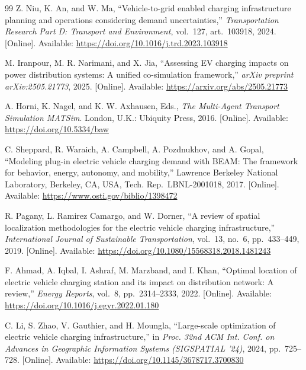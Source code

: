 \begin{thebibliography}{99}
    Z. Niu, K. An, and W. Ma,
    ``Vehicle-to-grid enabled charging infrastructure planning and operations considering demand uncertainties,''
    \textit{Transportation Research Part D: Transport and Environment}, vol.~127, art.~103918, 2024. [Online]. Available:
    \url{https://doi.org/10.1016/j.trd.2023.103918}

    M. Iranpour, M. R. Narimani, and X. Jia,
    ``Assessing EV charging impacts on power distribution systems: A unified co-simulation framework,''
    \textit{arXiv preprint arXiv:2505.21773}, 2025. [Online]. Available:
    \url{https://arxiv.org/abs/2505.21773}

    A. Horni, K. Nagel, and K. W. Axhausen, Eds.,
    \textit{The Multi-Agent Transport Simulation MATSim}.
    London, U.K.: Ubiquity Press, 2016. [Online]. Available:
    \url{https://doi.org/10.5334/baw}

    C. Sheppard, R. Waraich, A. Campbell, A. Pozdnukhov, and A. Gopal,
    ``Modeling plug-in electric vehicle charging demand with BEAM: The framework for behavior, energy, autonomy, and mobility,''
    Lawrence Berkeley National Laboratory, Berkeley, CA, USA,
    Tech. Rep.~LBNL-2001018, 2017. [Online]. Available:
    \url{https://www.osti.gov/biblio/1398472}

    R. Pagany, L. Ramirez Camargo, and W. Dorner,
    ``A review of spatial localization methodologies for the electric vehicle charging infrastructure,''
    \textit{International Journal of Sustainable Transportation}, vol.~13, no.~6, pp.~433--449, 2019. [Online]. Available:
    \url{https://doi.org/10.1080/15568318.2018.1481243}

    F. Ahmad, A. Iqbal, I. Ashraf, M. Marzband, and I. Khan,
    ``Optimal location of electric vehicle charging station and its impact on distribution network: A review,''
    \textit{Energy Reports}, vol.~8, pp.~2314--2333, 2022. [Online]. Available:
    \url{https://doi.org/10.1016/j.egyr.2022.01.180}

    C. Li, S. Zhao, V. Gauthier, and H. Moungla,
    ``Large-scale optimization of electric vehicle charging infrastructure,''
    in \textit{Proc. 32nd ACM Int. Conf. on Advances in Geographic Information Systems (SIGSPATIAL '24)}, 2024, pp.~725--728. [Online]. Available:
    \url{https://doi.org/10.1145/3678717.3700830}


\end{thebibliography}
